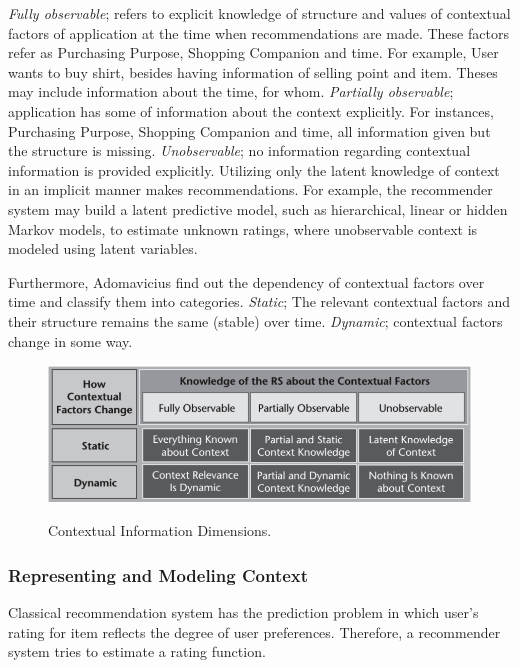 \textit{Fully observable}; refers to explicit knowledge of structure and values of contextual factors of application at the time when recommendations are made. These factors refer as Purchasing Purpose, Shopping Companion and time. For example, User wants to buy shirt, besides having information of selling point and item. Theses may include information about the time, for whom. \textit{Partially observable}; application has some of information about the context explicitly. For instances, Purchasing Purpose, Shopping Companion and time, all information given but the structure is missing. \textit{Unobservable}; no information regarding contextual information is provided explicitly. Utilizing only the latent knowledge of context in an implicit manner makes recommendations. For example, the recommender system may build a latent predictive model, such as hierarchical, linear or hidden Markov models, to estimate unknown ratings, where unobservable context is modeled using latent variables.\newline

Furthermore, Adomavicius \cite{adomavicius2011context} find out the dependency of contextual factors over time and classify them into categories. \textit{Static}; The relevant contextual factors and their structure remains the same (stable) over time. \textit{Dynamic}; contextual factors change in some way.

\begin{figure}[h]
	\centering
	\includegraphics[width=.98\linewidth]{figures/ch2_context_dimensions.png}
	\caption{Contextual Information Dimensions.} 
	\cite{adomavicius2011context}
	\label{fig:ch2_context_dimensions}
\end{figure}

\subsubsection{Representing and Modeling Context}

Classical recommendation system has the prediction problem in which user’s rating for item reflects the degree of user preferences. Therefore, a recommender system tries to estimate a rating function.

